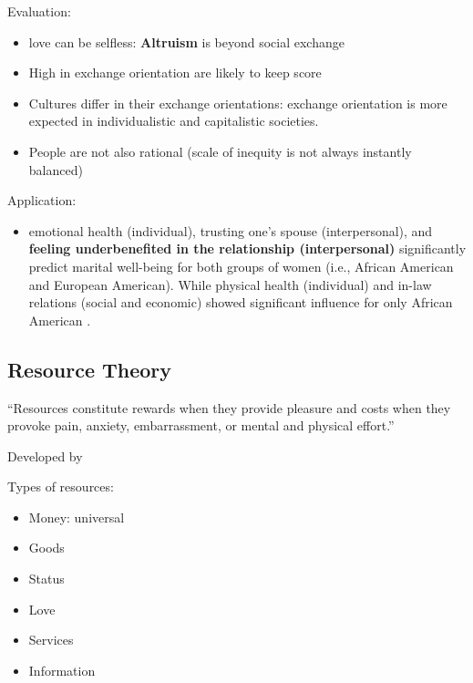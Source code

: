\documentclass[
]{book}
\providecommand{\tightlist}{%
  \setlength{\itemsep}{0pt}\setlength{\parskip}{0pt}}
\begin{document}
Evaluation:

\begin{itemize}
\tightlist
\item
  love can be selfless: \textbf{Altruism} is beyond social exchange\\
\item
  High in exchange orientation are likely to keep score \citep{Murstein_1971}\\
\item
  Cultures differ in their exchange orientations: exchange orientation is more expected in individualistic and capitalistic societies. \citep{Van_Yperen_1990}\\
\item
  People are not also rational (scale of inequity is not always instantly balanced)
\end{itemize}

Application:

\begin{itemize}
\tightlist
\item
  emotional health (individual), trusting one's spouse (interpersonal), and \textbf{feeling underbenefited in the relationship (interpersonal)} significantly predict marital well-being for both groups of women (i.e., African American and European American). While physical health (individual) and in-law relations (social and economic) showed significant influence for only African American \citep{Goodwin_2003}.
\end{itemize}

\hypertarget{resource-theory}{%
\subsection{Resource Theory}\label{resource-theory}}

``Resources constitute rewards when they provide pleasure and costs when they provoke pain, anxiety, embarrassment, or mental and physical effort.''

Developed by \citep{Foa_1980, Foa_2012}

Types of resources:

\begin{itemize}
\tightlist
\item
  Money: universal\\
\item
  Goods\\
\item
  Status\\
\item
  Love\\
\item
  Services\\
\item
  Information
\end{itemize}
\end{document}
